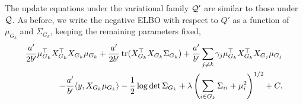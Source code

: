 The update equations under the variational family $\mathcal{Q}'$ are similar to those under $\mathcal{Q}$. As before, we write the negative ELBO with respect to $Q'$ as a function of $\mu_{G_k}$ and $\Sigma_{G_k}$, keeping the remaining parameters fixed,
\begin{equation} \label{eq:QD_mu_sigma_obj}
\begin{aligned}
    \frac{a'}{2b'} 
    \mu_{G_k}^\top X_{G_k}^\top X_{G_k} \mu_{G_k}
+
    \frac{a'}{2b'} 
    \operatorname{tr}( X_{G_k}^\top X_{G_k} \Sigma_{G_k})
+
    \frac{a'}{b'} 
    \sum_{j \neq k} 
	\gamma_j \mu_{G_k}^\top X_{G_k}^\top X_{G_j} \mu_{G_j} \\
-
    \frac{a'}{b'} 
    \langle y, X_{G_k} \mu_{G_k} \rangle 
-	
    \frac{1}{2} \log \det \Sigma_{G_k} 
+
    \lambda \left( \sum_{i \in G_k} 
	\Sigma_{ii} + \mu_i^2
    \right)^{1/2} + C.
\end{aligned}
\end{equation}

